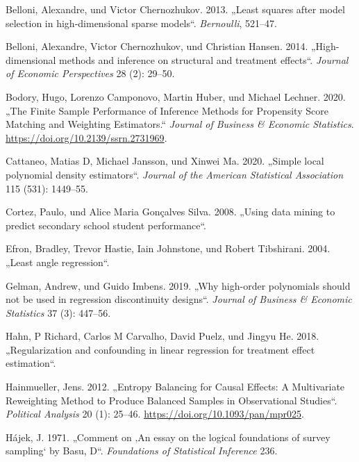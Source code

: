 \documentclass[
  a4paper,
  DIV=11,
  oneside]{scrreprt}
\newlength{\cslhangindent}
\newlength{\cslentryspacingunit} %
\newenvironment{CSLReferences}[2] %
 {%
  \setlength{\parindent}{0pt}
  \ifodd #1
  \let\oldpar\par
  \def\par{\hangindent=\cslhangindent\oldpar}
  \fi
  \setlength{\parskip}{#2\cslentryspacingunit}
 }%
 {}
\begin{document}
\begin{CSLReferences}{1}{0}
\leavevmode{}%
Belloni, Alexandre, und Victor Chernozhukov. 2013. {„Least squares after
model selection in high-dimensional sparse models``}. \emph{Bernoulli},
521--47.

\leavevmode{}%
Belloni, Alexandre, Victor Chernozhukov, und Christian Hansen. 2014.
{„High-dimensional methods and inference on structural and treatment
effects``}. \emph{Journal of Economic Perspectives} 28 (2): 29--50.

\leavevmode{}%
Bodory, Hugo, Lorenzo Camponovo, Martin Huber, und Michael Lechner.
2020. {„The Finite Sample Performance of Inference Methods for
Propensity Score Matching and Weighting Estimators.``} \emph{Journal of
Business \& Economic Statistics}.
\url{https://doi.org/10.2139/ssrn.2731969}.

\leavevmode{}%
Cattaneo, Matias D, Michael Jansson, und Xinwei Ma. 2020. {„Simple local
polynomial density estimators``}. \emph{Journal of the American
Statistical Association} 115 (531): 1449--55.

\leavevmode{}%
Cortez, Paulo, und Alice Maria Gonçalves Silva. 2008. {„Using data
mining to predict secondary school student performance``}.

\leavevmode{}%
Efron, Bradley, Trevor Hastie, Iain Johnstone, und Robert Tibshirani.
2004. {„Least angle regression``}.

\leavevmode{}%
Gelman, Andrew, und Guido Imbens. 2019. {„Why high-order polynomials
should not be used in regression discontinuity designs``}. \emph{Journal
of Business \& Economic Statistics} 37 (3): 447--56.

\leavevmode{}%
Hahn, P Richard, Carlos M Carvalho, David Puelz, und Jingyu He. 2018.
{„Regularization and confounding in linear regression for treatment
effect estimation``}.

\leavevmode{}%
Hainmueller, Jens. 2012. {„Entropy Balancing for Causal Effects: A
Multivariate Reweighting Method to Produce Balanced Samples in
Observational Studies``}. \emph{Political Analysis} 20 (1): 25--46.
\url{https://doi.org/10.1093/pan/mpr025}.

\leavevmode{}%
Hájek, J. 1971. {„Comment on {‚An essay on the logical foundations of
survey sampling`} by Basu, D``}. \emph{Foundations of Statistical
Inference} 236.


\end{CSLReferences}
\end{document}
